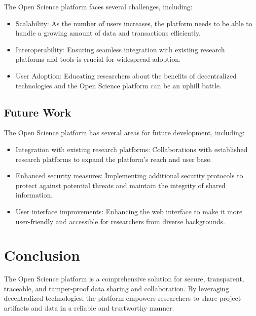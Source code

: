 \documentclass{article}
\begin{document}
The Open Science platform faces several challenges, including:

\begin{itemize}
      \item Scalability: As the number of users increases, the platform needs to be able to handle a growing amount of data and transactions efficiently.
      \item Interoperability: Ensuring seamless integration with existing research platforms and tools is crucial for widespread adoption.
      \item User Adoption: Educating researchers about the benefits of decentralized technologies and the Open Science platform can be an uphill battle.
\end{itemize}

\subsection{Future Work}

The Open Science platform has several areas for future development, including:

\begin{itemize}
      \item Integration with existing research platforms: Collaborations with established research platforms to expand the platform's reach and user base.
      \item Enhanced security measures: Implementing additional security protocols to protect against potential threats and maintain the integrity of shared information.
      \item User interface improvements: Enhancing the web interface to make it more user-friendly and accessible for researchers from diverse backgrounds.
\end{itemize}

\section{Conclusion}
The Open Science platform is a comprehensive solution for secure, transparent, traceable, and tamper-proof data sharing and collaboration. By leveraging decentralized technologies, the platform empowers researchers to share project artifacts and data in a reliable and trustworthy manner.
\end{document}
